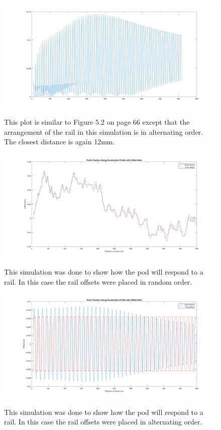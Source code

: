 \documentclass[main.tex]{subfiles}
\begin{document}
    \begin{figure}
        	\centering
        \includegraphics[width=\linewidth]{images/OscillatingMaxDistToRail}
        \label{fig:OMaxDistRail}
        \caption{This plot is similar to Figure 5.2 on page 66 except that the arrangement of the rail in this simulation is in alternating order. The closest distance is again 12mm.}
    \end{figure}
    \begin{figure}[H]
    	\centering
        \includegraphics[width=\linewidth]{images/RandPodLateralResponse}
        \label{fig:RandpodLateralResponse}
        \caption{This simulation was done to show how the pod will respond to a rail. In this case the rail offsets were placed in random order.}
    \end{figure}
    \begin{figure}[H]
    	\centering
        \includegraphics[width=\linewidth]{images/OscillatingPodLateralResponse}
        \label{fig:OPodLateralRespnse}
        \caption{This simulation was done to show how the pod will respond to a rail. In this case the rail offsets were placed in alternating order.}
    \end{figure}
    
\end{document}
